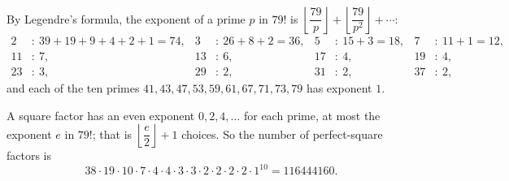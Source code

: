 By Legendre's formula, the exponent of a prime $p$ in $79!$ is $\left\lfloor\dfrac{79}{p}\right\rfloor+\left\lfloor\dfrac{79}{p^2}\right\rfloor+\cdots$:
\begin{align*}
2&:\ 39+19+9+4+2+1=74, & 3&:\ 26+8+2=36, & 5&:\ 15+3=18, & 7&:\ 11+1=12,\\
11&:\ 7, & 13&:\ 6, & 17&:\ 4, & 19&:\ 4,\\
23&:\ 3, & 29&:\ 2, & 31&:\ 2, & 37&:\ 2,
\end{align*}
and each of the ten primes $41,43,47,53,59,61,67,71,73,79$ has exponent $1$.

A square factor has an even exponent $0,2,4,\dots$ for each prime, at most the exponent $e$ in $79!$; that is $\left\lfloor\dfrac e2\right\rfloor+1$ choices. So the number of perfect-square factors is
\[38\cdot19\cdot10\cdot7\cdot4\cdot4\cdot3\cdot3\cdot2\cdot2\cdot2\cdot2\cdot1^{10}=\boxed{116444160}.\]
